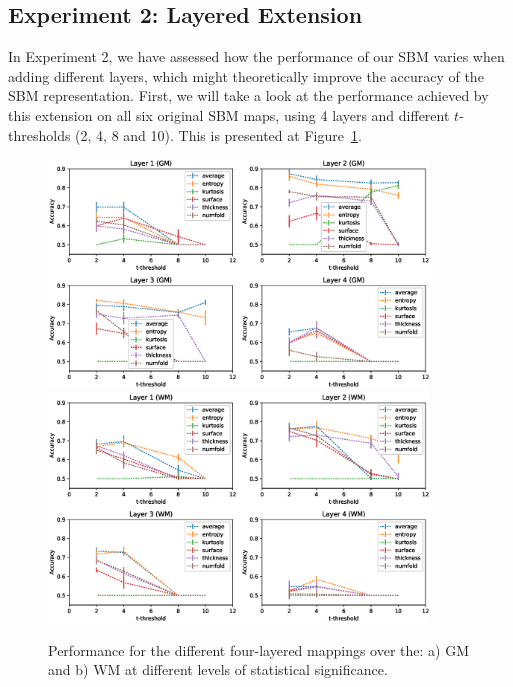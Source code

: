 \subsection{Experiment 2: Layered Extension}\label{sec:layeredttest}
In Experiment 2, we have assessed how the performance of our \ac{SBM} varies when adding different layers, which might theoretically improve the accuracy of the \ac{SBM} representation. First, we will take a look at the performance achieved by this extension on all six original \ac{SBM} maps, using 4 layers and different $t$-thresholds (2, 4, 8 and 10). This is presented at Figure~\ref{fig:layeredPerf}. 

\begin{figure}[htp]
	\myfloatalign
	\includegraphics[width=0.9\textwidth]{Graphics/ch6/layerPerfGM}\\
	\includegraphics[width=0.9\textwidth]{Graphics/ch6/layerPerfWM}
	
	\caption[Performance of the four-layered mappings.]{Performance for the different four-layered mappings over the: a) \acs{GM} and b) \acs{WM} at different levels of statistical significance.}
	\label{fig:layeredPerf}
\end{figure}

